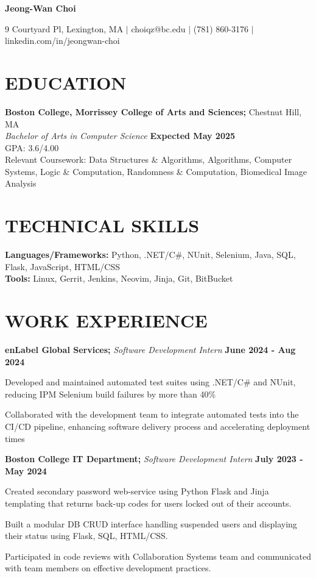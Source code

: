 \documentclass[11pt]{article}
\begin{document}
\begin{center}
\textbf{\LARGE Jeong-Wan Choi}
\end{center}

\begin{center}
9 Courtyard Pl, Lexington, MA $|$ choiqz@bc.edu $|$ (781) 860-3176 $|$ linkedin.com/in/jeongwan-choi 
\end{center}

\section*{EDUCATION}
\textbf{Boston College, Morrissey College of Arts and Sciences;} Chestnut Hill, MA \\
\textit{Bachelor of Arts in Computer Science} \hfill \textbf{Expected May 2025} \\
GPA: 3.6/4.00 \\
Relevant Coursework: Data Structures \& Algorithms, Algorithms, Computer Systems, Logic \& Computation, Randomness \& Computation, Biomedical Image Analysis 

\section*{TECHNICAL SKILLS}
\textbf{Languages/Frameworks:} Python, .NET/C\#, NUnit, Selenium, Java, SQL, Flask, JavaScript, HTML/CSS\\
\textbf{Tools:} Linux, Gerrit, Jenkins, Neovim, Jinja, Git, BitBucket 

\section*{WORK EXPERIENCE}
\textbf{enLabel Global Services;} \textit{Software Development Intern} \hfill \textbf{June 2024 - Aug 2024}
\begin{sublist}
	\item Developed and maintained automated test suites using .NET/C\# and NUnit, reducing IPM Selenium build failures by more than 40\%  
	\item Collaborated with the development team to integrate automated tests into the CI/CD pipeline, enhancing software delivery process and accelerating deployment times
\end{sublist}

\raggedright
\textbf{Boston College IT Department;} \textit{Software Development Intern} \hfill \textbf{July 2023 - May 2024}
\begin{sublist}
	\item Created secondary password web-service using Python Flask and Jinja templating that returns back-up codes for users locked out of their accounts. 
	\item Built a modular DB CRUD interface handling suspended users and displaying their status using Flask, SQL, HTML/CSS.
	\item Participated in code reviews with Collaboration Systems team and communicated with team members on effective development practices.
\end{sublist}
\end{document}
